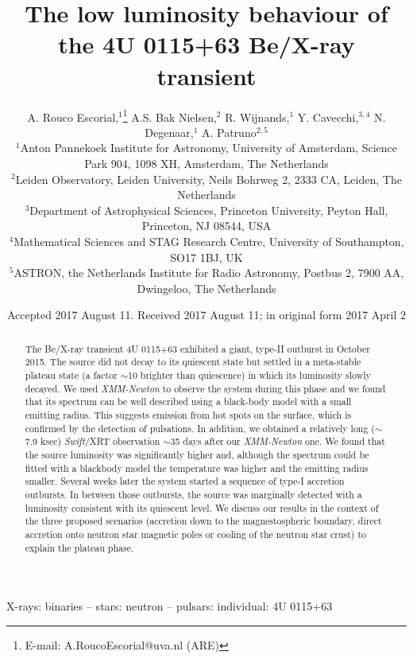\documentclass[a4paper,fleqn,usenatbib]{mnras}
\title[The X-rays plateau phase of 4U 0115+63]{The low luminosity behaviour of the 4U 0115+63 Be/X-ray transient}
\author[A. Rouco Escorial et al.]{
\Large A. Rouco Escorial,$^{1}$\thanks{E-mail: A.RoucoEscorial@uva.nl (ARE)}
A.S. Bak Nielsen,$^{2}$
R. Wijnands,$^{1}$
Y. Cavecchi,$^{3,4}$
N. Degenaar,$^{1}$
A. Patruno$^{2,5}$
\\
$^{1}$Anton Pannekoek Institute for Astronomy, University of Amsterdam, Science Park 904, 1098 XH, Amsterdam, The Netherlands\\
$^{2}$Leiden Observatory, Leiden University, Neils Bohrweg 2, 2333 CA, Leiden, The Netherlands\\
$^{3}$Department of Astrophysical Sciences, Princeton University, Peyton Hall, Princeton, NJ 08544, USA\\
$^{4}$Mathematical Sciences and STAG Research Centre, University of Southampton, SO17 1BJ, UK\\
$^{5}$ASTRON, the Netherlands Institute for Radio Astronomy, Postbus 2, 7900 AA, Dwingeloo, The Netherlands\\
}
\date{Accepted 2017 August 11. Received 2017 August 11; in original form 2017 April 2}
\begin{document}
\label{firstpage}
\pagerange{\pageref{firstpage}--\pageref{lastpage}}
\maketitle

\begin{abstract}
The Be/X-ray transient 4U 0115+63 exhibited a giant, type-II outburst in October 2015. The source did not decay to its quiescent state but settled in a meta-stable plateau state (a factor $\sim$10 brighter than quiescence) in which its luminosity slowly decayed. We used \textit{XMM-Newton} to observe the system during this phase and we found that its spectrum can be well described using a black-body model with a small emitting radius. This suggests emission from hot spots on the surface, which is confirmed by the detection of pulsations. In addition, we obtained a relatively long ($\sim$7.9 ksec) \textit{Swift}/XRT observation $\sim$35 days after our \textit{XMM-Newton} one. We found that the source luminosity was significantly higher and, although the spectrum could be fitted with a blackbody model the temperature was higher and the emitting radius smaller. Several weeks later the system started a sequence of type-I accretion outbursts. In between those outbursts, the source was marginally detected with a luminosity consistent with its quiescent level. We discuss our results in the context of the three proposed scenarios (accretion down to the magnestospheric boundary, direct accretion onto neutron star magnetic poles or cooling of the neutron star crust) to explain the plateau phase.\\
\end{abstract}
\begin{keywords}
X-rays: binaries -- stars: neutron --  pulsars: individual: 4U 0115+63
\end{keywords}

\end{document}
